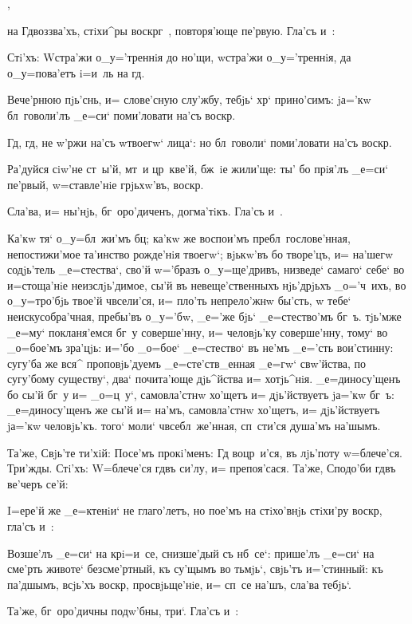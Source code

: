 ,

на Гд воззва'хъ, стiхи^ры воскр г~, повторя'юще 
пе'рвую. Гла'съ и~:

Стi'хъ: W\т стра'жи о_у='треннiя до но'щи, w\т стра'жи 
о_у='треннiя, да о_у=пова'етъ i=и~ль на гд.

Вече'рнюю пjь'снь, и= слове'сную слу'жбу, тебjь` 
хр` прино'симъ: jа='кw бл~говоли'лъ _е=си` 
поми'ловати на'съ воскр.

Гд, гд, не w'ржи на'съ w\т твоегw` лица`: но 
бл~говоли` поми'ловати на'съ воскр.

Ра'дуйся сiw'не ст~ы'й, мт~и цр~кве'й, бж~iе жили'ще: 
ты' бо прiя'лъ _е=си` пе'рвый, w=ставле'нiе грjьхw'въ, 
воскр.

Сла'ва, и= ны'нjь, бг~оро'диченъ, догма'тiкъ. Гла'съ 
и~.

Ка'кw тя` о_у=бл~жи'мъ бц; ка'кw же воспои'мъ 
пребл~гослове'нная, непостижи'мое та'инство рожде'нiя 
твоегw`; вjькw'въ бо творе'цъ, и= на'шегw содjь'тель 
_е=стества`, сво'й w='бразъ о_у=ще'дривъ, низведе` 
самаго` себе` во и=стоща'нiе неизслjь'димое, сы'й въ 
невеще'ственныхъ нjь'дрjьхъ _о='ч~ихъ, во о_у=тро'бjь 
твое'й ч всели'ся, и= пло'ть непрело'жнw бы'сть, w\т 
тебе` неискусобра'чная, пребы'въ о_у='бw, _е='же бjь` 
_е=стество'мъ бг~ъ. тjь'мже _е=му` покланя'емся бг~у 
соверше'нну, и= человjь'ку соверше'нну, тому` во 
_о=бое'мъ зра'цjь: и='бо _о=бое` _е=стество` въ не'мъ 
_е='сть вои'стинну: сугу'ба же вся^ проповjь'дуемъ 
_е=сте'ств_енная _е=гw` свw'йства, по сугу'бому 
существу`, два` почита'юще дjь^йства и= хотjь^нiя. 
_е=диносу'щенъ бо сы'й бг~у и= _о=ц~у`, самовла'стнw 
хо'щетъ и= дjь'йствуетъ jа='кw бг~ъ: _е=диносу'щенъ же 
сы'й и= на'мъ, самовла'стнw хо'щетъ, и= дjь'йствуетъ 
jа='кw человjь'къ. того` моли` ч всебл~же'нная, 
сп~сти'ся душа'мъ на'шымъ.

Та'же, Свjь'те ти'хiй: Посе'мъ прокi'менъ: Гд 
воцр~и'ся, въ лjь'поту w=блече'ся. Три'жды. Стi'хъ: 
W=блече'ся гд въ си'лу, и= препоя'сася. Та'же, 
Сподо'би гд въ ве'черъ се'й:

I=ере'й же _е=ктенiи` не глаго'летъ, но пое'мъ на 
стiхо'внjь стiхи'ру воскр, гла'съ и~:

Возше'лъ _е=си` на кр i=и~се, снизше'дый съ 
нб~се`: прише'лъ _е=си` на сме'рть животе` безсме'ртный, 
къ су'щымъ во тьмjь`, свjь'тъ и='стинный: къ па'дшымъ, 
всjь'хъ воскр, просвjьще'нiе, и= сп~се на'шъ, сла'ва 
тебjь`.

Та'же, бг~оро'дичны подw'бны, три`. Гла'съ и~:

